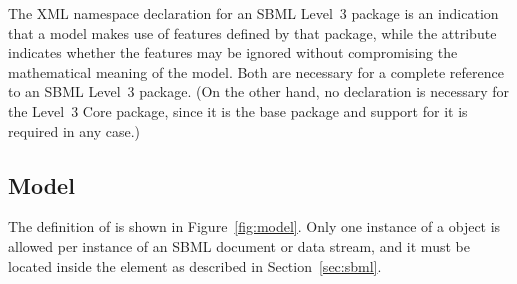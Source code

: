 The XML namespace declaration for an SBML Level~3 package is an
indication that a model makes use of features defined by that
package, while the  attribute indicates whether
the features may be ignored without compromising the mathematical
meaning of the model.  Both are necessary for a complete reference
to an SBML Level~3 package.  (On the other hand, no declaration is
necessary for the Level~3 Core package, since it is the base
package and support for it is required in any case.)



%
%
%
%
%
%


\subsection{Model}
\label{sec:model}

The definition of \Model is shown in Figure~\vref{fig:model}.
Only one instance of a \Model object is allowed per instance of an
SBML \thisLV document or data stream, and it must be located
inside the  element as described in
Section~\ref{sec:sbml}.

